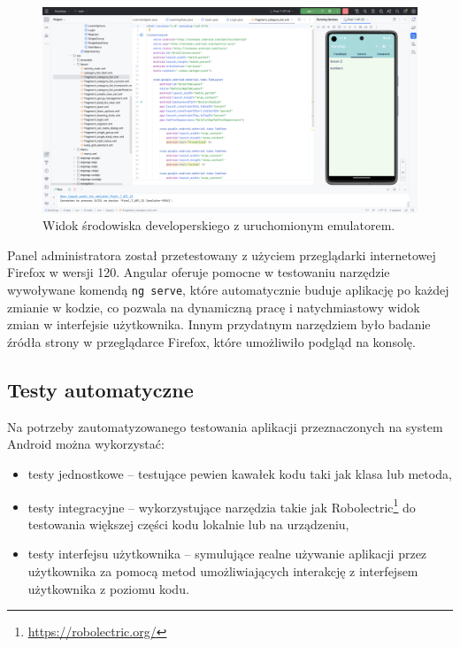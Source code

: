 \documentclass[a4paper,twoside,12pt]{book}
\begin{document}
\begin{figure}[]
\centering
\includegraphics[width=\textwidth]{androidstudio}
\caption{Widok środowiska developerskiego z uruchomionym emulatorem.}
\label{fig:androidstudio}
\end{figure}

Panel administratora został przetestowany z użyciem przeglądarki internetowej Firefox w wersji 120. Angular oferuje pomocne w testowaniu narzędzie wywoływane komendą \texttt{ng serve}, które automatycznie buduje aplikację po każdej zmianie w kodzie, co pozwala na dynamiczną pracę i natychmiastowy widok zmian w interfejsie użytkownika. Innym przydatnym narzędziem było badanie źródła strony w przeglądarce Firefox, które umożliwiło podgląd na konsolę. 

\subsection{Testy automatyczne}

Na potrzeby zautomatyzowanego testowania aplikacji przeznaczonych na system Android można wykorzystać:
\begin{itemize}
\item testy jednostkowe -- testujące pewien kawałek kodu taki jak klasa lub metoda,
\item testy integracyjne -- wykorzystujące narzędzia takie jak Robolectric\footnote{\url{https://robolectric.org/}} do testowania większej części kodu lokalnie lub na urządzeniu,
\item testy interfejsu użytkownika -- symulujące realne używanie aplikacji przez użytkownika za pomocą metod umożliwiających interakcję z interfejsem użytkownika z poziomu kodu.
\end{itemize}
\end{document}
